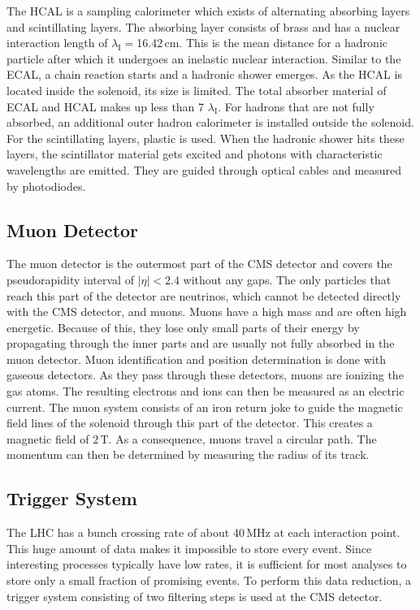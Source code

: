 The HCAL is a sampling calorimeter which exists of alternating absorbing layers and scintillating layers. The absorbing layer consists of brass and has a nuclear interaction length of $\lambda_\textrm{I} = $16.42\,cm. This is the mean distance for a hadronic particle after which it undergoes an inelastic nuclear interaction. Similar to the ECAL, a chain reaction starts and a hadronic shower emerges. As the HCAL is located inside the solenoid, its size is limited. The total absorber material of ECAL and HCAL makes up less than 7 $\lambda_\textrm{I}$. For hadrons that are not fully absorbed, an additional outer hadron calorimeter is installed outside the solenoid.
For the scintillating layers, plastic is used. When the hadronic shower hits these layers, the scintillator material gets excited and photons with characteristic wavelengths are emitted. They are guided through optical cables and measured by photodiodes.

\subsection*{Muon Detector}
The muon detector \cite{MuonChamber} is the outermost part of the CMS detector and covers the pseudorapidity interval of $|\eta| < 2.4$ without any gaps. The only particles that reach this part of the detector are neutrinos, which cannot be detected directly with the CMS detector, and muons. Muons have a high mass and are often high energetic. Because of this, they lose only small parts of their energy by propagating through the inner parts and are usually not fully absorbed in the muon detector. Muon identification and position determination is done with gaseous detectors. As they pass through these detectors, muons are ionizing the gas atoms. The resulting electrons and ions can then be measured as an electric current. The muon system consists of an iron return joke to guide the magnetic field lines of the solenoid through this part of the detector. This creates a magnetic field of 2\,T. As a consequence, muons travel a circular path. The momentum can then be determined by measuring the radius of its track. 

\subsection*{Trigger System}
The LHC has a bunch crossing rate of about 40\,MHz at each interaction point. This huge amount of data makes it impossible to store every event. Since interesting processes typically have low rates, it is sufficient for most analyses to store only a small fraction of promising events. To perform this data reduction, a trigger system \cite{TriggerDesignRep} consisting of two filtering steps is used at the CMS detector.\\

